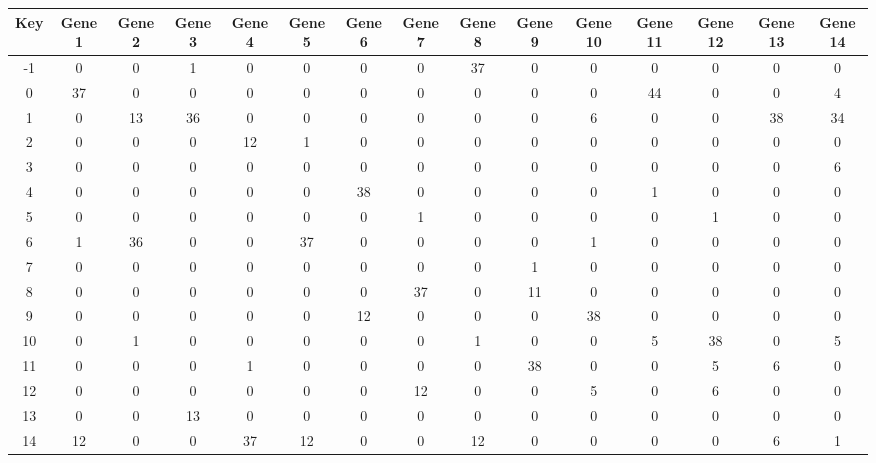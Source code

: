 \begin{tabular}{|c|c|c|c|c|c|c|c|c|c|c|c|c|c|c|}
\hline
Key & Gene 1 & Gene 2 & Gene 3 & Gene 4 & Gene 5 & Gene 6 & Gene 7 & Gene 8 & Gene 9 & Gene 10 & Gene 11 & Gene 12 & Gene 13 & Gene 14 \\
\hline
-1 & 0 & 0 & 1 & 0 & 0 & 0 & 0 & 37 & 0 & 0 & 0 & 0 & 0 & 0 \\
0 & 37 & 0 & 0 & 0 & 0 & 0 & 0 & 0 & 0 & 0 & 44 & 0 & 0 & 4 \\
1 & 0 & 13 & 36 & 0 & 0 & 0 & 0 & 0 & 0 & 6 & 0 & 0 & 38 & 34 \\
2 & 0 & 0 & 0 & 12 & 1 & 0 & 0 & 0 & 0 & 0 & 0 & 0 & 0 & 0 \\
3 & 0 & 0 & 0 & 0 & 0 & 0 & 0 & 0 & 0 & 0 & 0 & 0 & 0 & 6 \\
4 & 0 & 0 & 0 & 0 & 0 & 38 & 0 & 0 & 0 & 0 & 1 & 0 & 0 & 0 \\
5 & 0 & 0 & 0 & 0 & 0 & 0 & 1 & 0 & 0 & 0 & 0 & 1 & 0 & 0 \\
6 & 1 & 36 & 0 & 0 & 37 & 0 & 0 & 0 & 0 & 1 & 0 & 0 & 0 & 0 \\
7 & 0 & 0 & 0 & 0 & 0 & 0 & 0 & 0 & 1 & 0 & 0 & 0 & 0 & 0 \\
8 & 0 & 0 & 0 & 0 & 0 & 0 & 37 & 0 & 11 & 0 & 0 & 0 & 0 & 0 \\
9 & 0 & 0 & 0 & 0 & 0 & 12 & 0 & 0 & 0 & 38 & 0 & 0 & 0 & 0 \\
10 & 0 & 1 & 0 & 0 & 0 & 0 & 0 & 1 & 0 & 0 & 5 & 38 & 0 & 5 \\
11 & 0 & 0 & 0 & 1 & 0 & 0 & 0 & 0 & 38 & 0 & 0 & 5 & 6 & 0 \\
12 & 0 & 0 & 0 & 0 & 0 & 0 & 12 & 0 & 0 & 5 & 0 & 6 & 0 & 0 \\
13 & 0 & 0 & 13 & 0 & 0 & 0 & 0 & 0 & 0 & 0 & 0 & 0 & 0 & 0 \\
14 & 12 & 0 & 0 & 37 & 12 & 0 & 0 & 12 & 0 & 0 & 0 & 0 & 6 & 1 \\
\hline
\end{tabular}